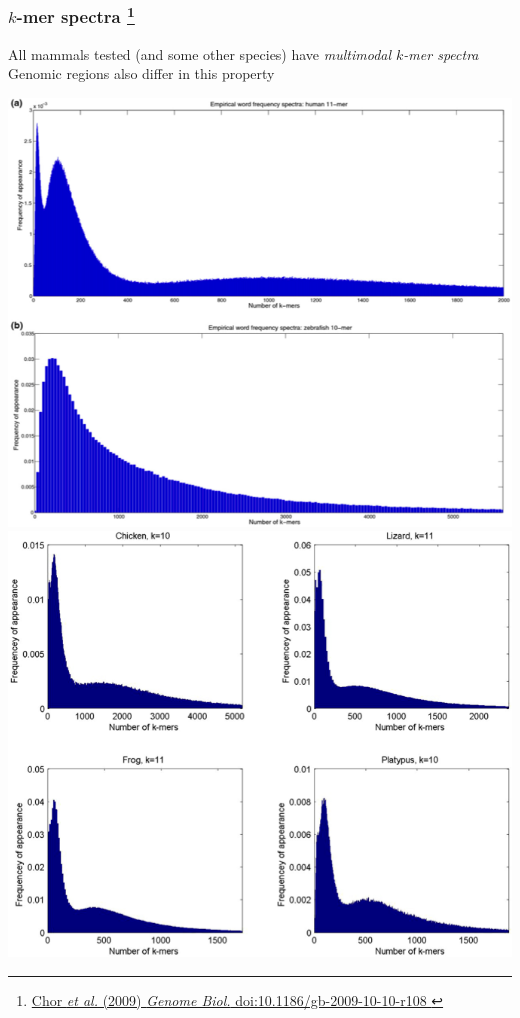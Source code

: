 %
\begin{frame}
  \frametitle{$k$-mer spectra
  \footnote{\tiny{\href{http://dx.doi.org/10.1186/gb-2009-10-10-r108
}{Chor \textit{et al.} (2009) \textit{Genome Biol.} doi:10.1186/gb-2009-10-10-r108
}}}
  }
  \textcolor{RawSienna}{All mammals tested (and some other species) have \textit{multimodal $k$-mer spectra}} \\
  Genomic regions also differ in this property
  \begin{center}
    \includegraphics[height=0.4\textheight]{images/kmer_mammal1}
    \includegraphics[height=0.4\textheight]{images/kmer_mammal2}    
  \end{center}  
\end{frame}
